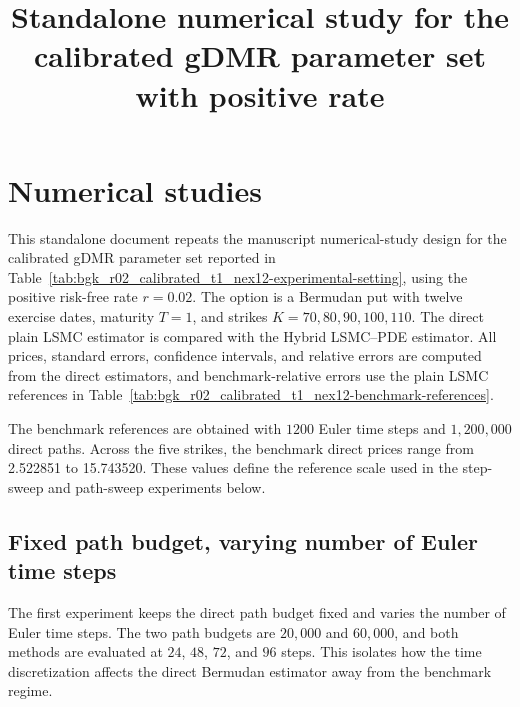 \documentclass[pdflatex,sn-mathphys-num]{sn-jnl}
\begin{document}
\title[Standalone numerical study for the calibrated gDMR parameter set with positive rate]{Standalone numerical study for the calibrated gDMR parameter set with positive rate}

\author[1]{ }
\author[1]{ }

\maketitle

\section{Numerical studies}

This standalone document repeats the manuscript numerical-study design for the calibrated gDMR parameter set reported in Table~\ref{tab:bgk_r02_calibrated_t1_nex12-experimental-setting}, using the positive risk-free rate \(r=0.02\). The option is a Bermudan put with twelve exercise dates, maturity \(T=1\), and strikes \(K=70,80,90,100,110\). The direct plain LSMC estimator is compared with the Hybrid LSMC--PDE estimator. All prices, standard errors, confidence intervals, and relative errors are computed from the direct estimators, and benchmark-relative errors use the plain LSMC references in Table~\ref{tab:bgk_r02_calibrated_t1_nex12-benchmark-references}.



The benchmark references are obtained with \(1200\) Euler time steps and \(1,200,000\) direct paths. Across the five strikes, the benchmark direct prices range from 2.522851 to 15.743520. These values define the reference scale used in the step-sweep and path-sweep experiments below.



\subsection{Fixed path budget, varying number of Euler time steps}

The first experiment keeps the direct path budget fixed and varies the number of Euler time steps. The two path budgets are \(20,000\) and \(60,000\), and both methods are evaluated at \(24\), \(48\), \(72\), and \(96\) steps. This isolates how the time discretization affects the direct Bermudan estimator away from the benchmark regime.
\end{document}
